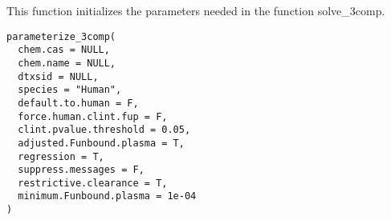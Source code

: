\documentclass[a4paper]{book}
\begin{document}
%
\begin{Description}\relax
This function initializes the parameters needed in the function solve\_3comp.
\end{Description}
%
\begin{Usage}
\begin{verbatim}
parameterize_3comp(
  chem.cas = NULL,
  chem.name = NULL,
  dtxsid = NULL,
  species = "Human",
  default.to.human = F,
  force.human.clint.fup = F,
  clint.pvalue.threshold = 0.05,
  adjusted.Funbound.plasma = T,
  regression = T,
  suppress.messages = F,
  restrictive.clearance = T,
  minimum.Funbound.plasma = 1e-04
)
\end{verbatim}
\end{Usage}
%
\end{document}
